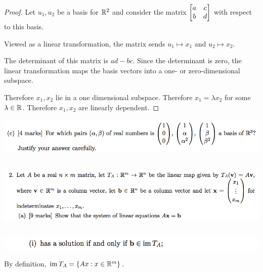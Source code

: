 \documentclass[12pt]{article}
\begin{document}
\begin{proof}
Let $u_1, u_2$ be a basis for $\mathbb{R}^2$ and consider the matrix
$\begin{bmatrix}a & c\\b & d\\ \end{bmatrix}$ with respect to this basis.

Viewed as a linear transformation, the matrix sends $u_1 \mapsto x_1$ and
$u_2 \mapsto x_2$.

The determinant of this matrix is $ad - bc$. Since the determinant is zero, the
linear transformation maps the basis vectors into a one- or zero-dimensional
subspace.

Therefore $x_1,x_2$ lie in a one dimensional subspace. Therefore
$x_1 = \lambda x_2$ for some $\lambda \in \mathbb{R}$. Therefore $x_1,x_2$ are linearly
dependent.

\end{proof}

\begin{mdframed}
\includegraphics[width=400pt]{img/oxford-prelims-2017-A-1-3.png}
\end{mdframed}


\subsection*{}  %
\begin{mdframed}
\includegraphics[width=400pt]{img/oxford-prelims-2017-A-2-1.png}
\end{mdframed}

\subsection*{}  %
\begin{mdframed}
\includegraphics[width=400pt]{img/oxford-prelims-2017-A-2-1-1.png}
\end{mdframed}

By definition,  $\operatorname{\text{im}} T_A = \{Ax: x \in \mathbb{R}^m\}$.
\end{document}
